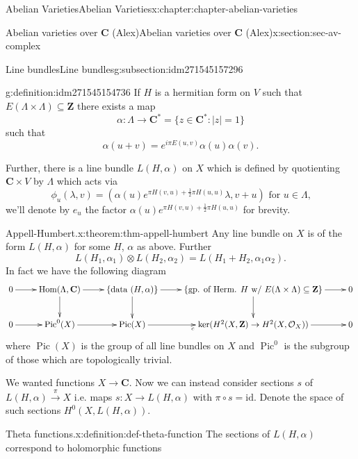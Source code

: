 \documentclass[oneside,10pt,]{book}
\numberwithin{equation}{section}
\newcommand{\sheaf}[1]{\operatorname{\mathcal{#1}}}
\newcommand{\ZZ}{\mathbf{Z}}
\newcommand{\CC}{\mathbf{C}}
\newcommand{\id}{\mathrm{id}}
\DeclareMathOperator{\Hom}{Hom}
\DeclareMathOperator{\Pic}{Pic}
\begin{document}
\begin{chapterptx}{Abelian Varieties}{}{Abelian Varieties}{}{}{x:chapter:chapter-abelian-varieties}
\begin{sectionptx}{Abelian varieties over \(\CC\) (Alex)}{}{Abelian varieties over \(\CC\) (Alex)}{}{}{x:section:sec-av-complex}
\begin{subsectionptx}{Line bundles}{}{Line bundles}{}{}{g:subsection:idm271545157296}
\begin{definition}{}{g:definition:idm271545154736}%
If \(H\) is a hermitian form on \(V\) such that \(E(\Lambda\times\Lambda) \subseteq \ZZ\) there exists a map%
\begin{equation*}
\alpha \colon \Lambda \to \CC^*  = \{z\in \CC^* : |z| = 1\}
\end{equation*}
such that%
\begin{equation*}
\alpha(u + v) = e^{i\pi E(u,v)} \alpha(u) \alpha(v)\text{.}
\end{equation*}
%
\par
Further, there is a line bundle \(L(H, \alpha)\) on \(X\) which is defined by quotienting \(\CC\times V\) by \(\Lambda\) which acts via%
\begin{equation*}
\phi_u(\lambda, v) = (\alpha(u)e^{\pi H(v,u) + \frac12 \pi H(u,u)}\lambda, v+u)\text{ for } u\in \Lambda\text{,}
\end{equation*}
we'll denote by \(e_u\) the factor \(\alpha(u)e^{\pi H(v,u) + \frac12 \pi H(u,u)}\) for brevity.%
\end{definition}
\begin{theorem}{Appell-Humbert.}{}{x:theorem:thm-appell-humbert}%
Any line bundle on \(X\) is of the form \(L(H,\alpha)\) for some \(H\), \(\alpha\) as above. Further%
\begin{equation*}
L(H_1, \alpha_1) \otimes L(H_2, \alpha_2)  = L(H_1+ H_2, \alpha_1\alpha_2)\text{.}
\end{equation*}
In fact we have the following diagram%
\begin{equation*}
\xymatrix{
0 \ar[r] &
\Hom(\Lambda, \CC) \ar[r]\ar[d] &
\{\text{data } (H,\alpha)\} \ar[r]\ar[d] &
\{\text{gp. of Herm. } H \text{ w/ }E(\Lambda\times \Lambda) \subseteq \ZZ\} \ar[r]\ar[d] &
0 \\
0 \ar[r] &
\Pic^0(X) \ar[r] &
\Pic(X) \ar[r]_c &
\ker(H^2(X,\ZZ) \to H^2(X,\sheaf O_X)) \ar[r]&
0
}
\end{equation*}
where \(\Pic(X)\) is the group of all line bundles on \(X\) and \(\Pic^0\) is the subgroup of those which are topologically trivial.%
\end{theorem}
We wanted functions \(X\to \CC\). Now we can instead consider sections \(s\) of \(L(H,\alpha) \xrightarrow{\pi} X\) i.e. maps \(s\colon X\to L(H,\alpha)\) with \(\pi\circ s = \id\). Denote the space of such sections \(H^0(X,L(H,\alpha))\).%
\begin{definition}{Theta functions.}{x:definition:def-theta-function}%
The sections of \(L(H, \alpha)\)  correspond to holomorphic functions%

\end{definition}
\end{subsectionptx}
\end{sectionptx}
\end{chapterptx}
\end{document}
